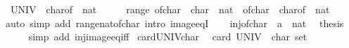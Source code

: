 \begin{isabellebody}
\ \ {\isachardoublequoteopen}UNIV\ {\isacharequal}{\kern0pt}\ char{\isacharunderscore}{\kern0pt}of\ {\isacharbackquote}{\kern0pt}\ {\isacharbraceleft}{\kern0pt}{}{\isacharcolon}{\kern0pt}{\isacharcolon}{\kern0pt}nat{\isachardot}{\kern0pt}{\isachardot}{\kern0pt}{\isacharless}{\kern0pt}{}{}{}{\isacharbraceright}{\kern0pt}{\isachardoublequoteclose}\isanewline
%
\isadelimproof
%
\endisadelimproof
%
\isatagproof
{}\isamarkupfalse%
\ {\isacharminus}{\kern0pt}\isanewline
\ \ \isamarkupfalse%
\ {\isachardoublequoteopen}range\ {\isacharparenleft}{\kern0pt}of{\isacharunderscore}{\kern0pt}char\ {\isacharcolon}{\kern0pt}{\isacharcolon}{\kern0pt}\ char\ {\isasymRightarrow}\ nat{\isacharparenright}{\kern0pt}\ {\isacharequal}{\kern0pt}\ of{\isacharunderscore}{\kern0pt}char\ {\isacharbackquote}{\kern0pt}\ char{\isacharunderscore}{\kern0pt}of\ {\isacharbackquote}{\kern0pt}\ {\isacharbraceleft}{\kern0pt}{}{\isacharcolon}{\kern0pt}{\isacharcolon}{\kern0pt}nat{\isachardot}{\kern0pt}{\isachardot}{\kern0pt}{\isacharless}{\kern0pt}{}{}{}{\isacharbraceright}{\kern0pt}{\isachardoublequoteclose}\isanewline
\ \ \ \ \isamarkupfalse%
\ {\isacharparenleft}{\kern0pt}auto\ simp\ add{\isacharcolon}{\kern0pt}\ range{\isacharunderscore}{\kern0pt}nat{\isacharunderscore}{\kern0pt}of{\isacharunderscore}{\kern0pt}char\ intro{\isacharbang}{\kern0pt}{\isacharcolon}{\kern0pt}\ image{\isacharunderscore}{\kern0pt}eqI{\isacharparenright}{\kern0pt}\isanewline
\ \ \isamarkupfalse%
\ inj{\isacharunderscore}{\kern0pt}of{\isacharunderscore}{\kern0pt}char\ {\isacharbrackleft}{\kern0pt}\ {\isacharquery}{\kern0pt}{\isacharprime}{\kern0pt}a\ {\isacharequal}{\kern0pt}\ nat{\isacharbrackright}{\kern0pt}\ \isamarkupfalse%
\ {\isacharquery}{\kern0pt}thesis\isanewline
\ \ \ \ \isamarkupfalse%
\ {\isacharparenleft}{\kern0pt}simp\ add{\isacharcolon}{\kern0pt}\ inj{\isacharunderscore}{\kern0pt}image{\isacharunderscore}{\kern0pt}eq{\isacharunderscore}{\kern0pt}iff{\isacharparenright}{\kern0pt}\isanewline
{}\isamarkupfalse%
%
\endisatagproof
{\isafoldproof}%
%
\isadelimproof
\isanewline
%
\endisadelimproof
\isanewline
{}\isamarkupfalse%
\ card{\isacharunderscore}{\kern0pt}UNIV{\isacharunderscore}{\kern0pt}char{\isacharcolon}{\kern0pt}\isanewline
\ \ {\isachardoublequoteopen}card\ {\isacharparenleft}{\kern0pt}UNIV\ {\isacharcolon}{\kern0pt}{\isacharcolon}{\kern0pt}\ char\ set{\isacharparenright}{\kern0pt}\ {\isacharequal}{\kern0pt}\ {}{}{}{\isachardoublequoteclose}\isanewline

\end{isabellebody}

